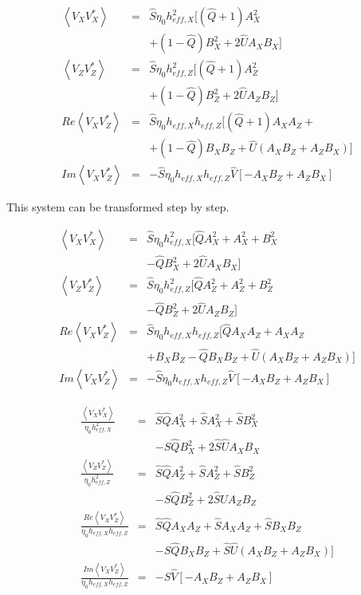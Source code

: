 \documentclass[a4paper,14pt]{extbook}
\begin{document}
\begin{eqnarray}
\left\langle V_X V_X^{*} \right\rangle &=& \hat{S}\eta_0 h_{eff,X}^2[(\hat{Q}+1) A^2_X   \\
&&+ (1-\hat{Q}) B^2_X+ 2 \hat{U}A_X B_X]  \nonumber \\
\left\langle V_Z V_Z^{*} \right\rangle &=& \hat{S}\eta_0 h_{eff,Z}^2[(\hat{Q}+1) A^2_Z   \\
&& + (1-\hat{Q}) B^2_Z+ 2 \hat{U}A_Z B_Z]  \nonumber \\
Re \left\langle V_X V_Z^{*}\right\rangle &=& \hat{S}\eta_0 h_{eff,X} h_{eff,Z}[(\hat{Q}+1) A_X A_Z +\\
&&+  (1-\hat{Q}) B_X B_Z + \hat{U} (A_X B_Z + A_Z B_X)] \nonumber \\
Im \left\langle V_X V_Z^{*}\right\rangle &=& -\hat{S}\eta_0 h_{eff,X} h_{eff,Z} \hat{V}[-A_X B_Z + A_Z B_X ]
\end{eqnarray}

This system can be transformed step by step.

\begin{eqnarray}
\left\langle V_X V_X^{*} \right\rangle &=& \hat{S}\eta_0 h_{eff,X}^2[\hat{Q}A^2_X+A^2_X + B^2_X \\
&&-\hat{Q} B^2_X+ 2 \hat{U}A_X B_X] \nonumber  \\
\left\langle V_Z V_Z^{*} \right\rangle &=& \hat{S}\eta_0 h_{eff,Z}^2[\hat{Q}A^2_Z+A^2_Z + B^2_Z\\
&&-\hat{Q} B^2_Z+ 2 \hat{U}A_Z B_Z]  \nonumber \\
Re \left\langle V_X V_Z^{*}\right\rangle &=& \hat{S}\eta_0 h_{eff,X} h_{eff,Z}[\hat{Q}A_X A_Z+ A_X A_Z  \\
&&+  B_X B_Z-\hat{Q} B_X B_Z +  \hat{U} (A_X B_Z + A_Z B_X)] \nonumber \\
Im \left\langle V_X V_Z^{*}\right\rangle &=& -\hat{S}\eta_0 h_{eff,X} h_{eff,Z} \hat{V}[-A_X B_Z + A_Z B_X ]
\end{eqnarray}

\begin{eqnarray}
\frac{\left\langle V_X V_X^{*} \right\rangle }{\eta_0 h_{eff,X}^2}&=& \hat{S}\hat{Q}A^2_X+\hat{S}A^2_X + \hat{S}B^2_X\\
&&-\hat{S}\hat{Q} B^2_X+ 2 \hat{S}\hat{U}A_X B_X \nonumber \\
\frac{\left\langle V_Z V_Z^{*} \right\rangle }{\eta_0 h_{eff,Z}^2}&=& \hat{S}\hat{Q}A^2_Z+\hat{S}A^2_Z + \hat{S}B^2_Z\\
&&-\hat{S}\hat{Q} B^2_Z+ 2 \hat{S}\hat{U}A_Z B_Z   \nonumber \\
\frac{Re \left\langle V_X V_Z^{*}\right\rangle }{\eta_0 h_{eff,X} h_{eff,Z}}&=& \hat{S}\hat{Q}A_X A_Z+ \hat{S}A_X A_Z +  \hat{S}B_X B_Z\\
&&-\hat{S}\hat{Q} B_X B_Z + \hat{S}\hat{U} (A_X B_Z + A_Z B_X)] \nonumber \\
\frac{Im \left\langle V_X V_Z^{*}\right\rangle }{\eta_0 h_{eff,X} h_{eff,Z}}&=& -\hat{S} \hat{V}[-A_X B_Z + A_Z B_X ]
\end{eqnarray}
\end{document}
